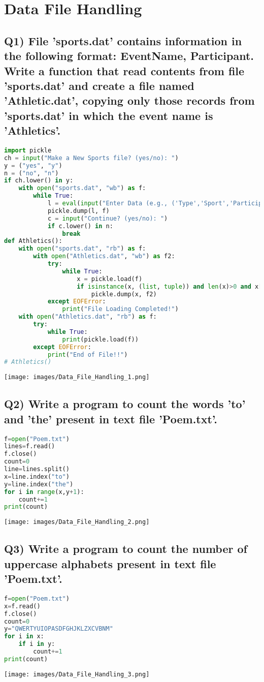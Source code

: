 \documentclass{article}
\begin{document}
\section{Data File Handling}

\subsection*{Q1) File 'sports.dat' contains information in the following format: EventName, Participant. Write a function that read contents from file 'sports.dat' and create a file named 'Athletic.dat', copying only those records from 'sports.dat' in which the event name is 'Athletics'.}
\begin{lstlisting}[language=Python]
import pickle
ch = input("Make a New Sports file? (yes/no): ")
y = ("yes", "y")
n = ("no", "n")
if ch.lower() in y:
    with open("sports.dat", "wb") as f:
        while True:
            l = eval(input("Enter Data (e.g., ('Type','Sport','Participant')): "))
            pickle.dump(l, f)
            c = input("Continue? (yes/no): ")
            if c.lower() in n:
                break
def Athletics():
    with open("sports.dat", "rb") as f:
        with open("Athletics.dat", "wb") as f2:
            try:
                while True:
                    x = pickle.load(f)
                    if isinstance(x, (list, tuple)) and len(x)>0 and x[0].lower() == "athletics":
                        pickle.dump(x, f2)
            except EOFError:
                print("File Loading Completed!")
    with open("Athletics.dat", "rb") as f:
        try:
            while True:
                print(pickle.load(f))
        except EOFError:
            print("End of File!!")
# Athletics()
\end{lstlisting}
\texttt{[image: images/Data\_File\_Handling\_1.png]}

\subsection*{Q2) Write a program to count the words 'to' and 'the' present in text file 'Poem.txt'.}
\begin{lstlisting}[language=Python]
f=open("Poem.txt")
lines=f.read()
f.close()
count=0
line=lines.split()
x=line.index("to")
y=line.index("the")
for i in range(x,y+1):
    count+=1
print(count)
\end{lstlisting}
\texttt{[image: images/Data\_File\_Handling\_2.png]}

\subsection*{Q3) Write a program to count the number of uppercase alphabets present in text file 'Poem.txt'.}
\begin{lstlisting}[language=Python]
f=open("Poem.txt")
x=f.read()
f.close()
count=0
y="QWERTYUIOPASDFGHJKLZXCVBNM"
for i in x:
    if i in y:
        count+=1
print(count)
\end{lstlisting}
\texttt{[image: images/Data\_File\_Handling\_3.png]}
\end{document}
